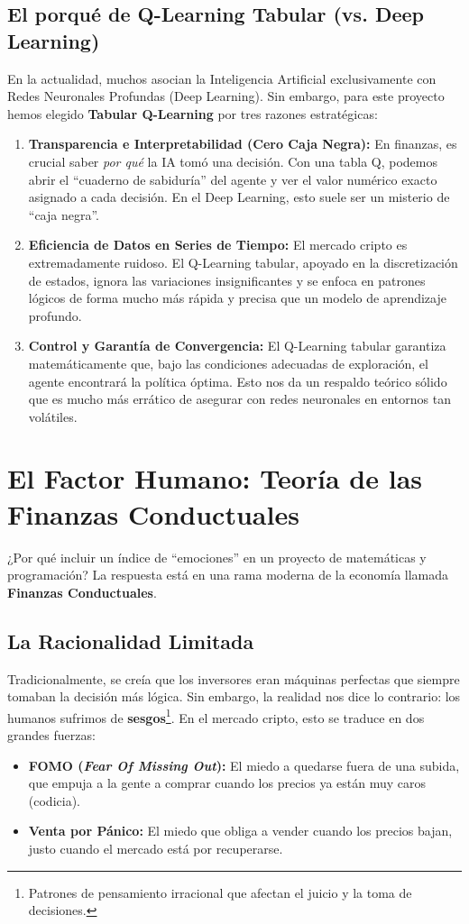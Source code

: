 \documentclass[12pt,a4paper]{article}
\begin{document}
\subsection{El porqué de Q-Learning Tabular (vs. Deep Learning)}
En la actualidad, muchos asocian la Inteligencia Artificial exclusivamente con Redes Neuronales Profundas (Deep Learning). Sin embargo, para este proyecto hemos elegido \textbf{Tabular Q-Learning} por tres razones estratégicas:
\begin{enumerate}
    \item \textbf{Transparencia e Interpretabilidad (Cero Caja Negra):} En finanzas, es crucial saber \textit{por qué} la IA tomó una decisión. Con una tabla Q, podemos abrir el ``cuaderno de sabiduría'' del agente y ver el valor numérico exacto asignado a cada decisión. En el Deep Learning, esto suele ser un misterio de ``caja negra''.
    \item \textbf{Eficiencia de Datos en Series de Tiempo:} El mercado cripto es extremadamente ruidoso. El Q-Learning tabular, apoyado en la discretización de estados, ignora las variaciones insignificantes y se enfoca en patrones lógicos de forma mucho más rápida y precisa que un modelo de aprendizaje profundo.
    \item \textbf{Control y Garantía de Convergencia:} El Q-Learning tabular garantiza matemáticamente que, bajo las condiciones adecuadas de exploración, el agente encontrará la política óptima. Esto nos da un respaldo teórico sólido que es mucho más errático de asegurar con redes neuronales en entornos tan volátiles.
\end{enumerate}

\section{El Factor Humano: Teoría de las Finanzas Conductuales}

¿Por qué incluir un índice de ``emociones'' en un proyecto de matemáticas y programación? La respuesta está en una rama moderna de la economía llamada \textbf{Finanzas Conductuales}.

\subsection{La Racionalidad Limitada}

Tradicionalmente, se creía que los inversores eran máquinas perfectas que siempre tomaban la decisión más lógica. Sin embargo, la realidad nos dice lo contrario: los humanos sufrimos de \textbf{sesgos}\footnote{Patrones de pensamiento irracional que afectan el juicio y la toma de decisiones.}. En el mercado cripto, esto se traduce en dos grandes fuerzas:
\begin{itemize}
    \item \textbf{FOMO (\textit{Fear Of Missing Out}):} El miedo a quedarse fuera de una subida, que empuja a la gente a comprar cuando los precios ya están muy caros (codicia).
    \item \textbf{Venta por Pánico:} El miedo que obliga a vender cuando los precios bajan, justo cuando el mercado está por recuperarse.
\end{itemize}
\end{document}
